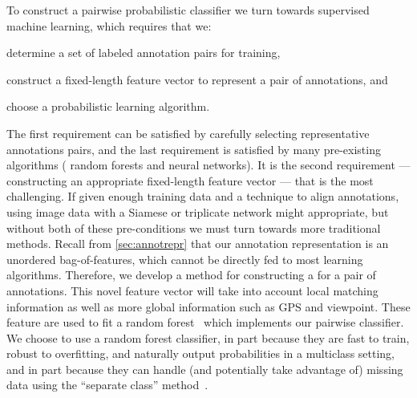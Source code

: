 \MatchStateExample{}

To construct a pairwise probabilistic classifier we turn towards supervised
  machine learning, which requires that we:
\begin{enumin}

    \item determine a set of labeled annotation pairs for training, 

    \item construct a fixed-length feature vector to represent a pair of
        annotations,  and 

    \item choose a probabilistic learning algorithm.
\end{enumin}
The first requirement can be satisfied by carefully selecting representative
  annotations pairs, and the last requirement is satisfied by many pre-existing
  algorithms (\eg{} random forests and neural networks).
It is the second requirement --- constructing an appropriate fixed-length
  feature vector --- that is the most challenging.
If given enough training data and a technique to align annotations, using
  image data with a Siamese or triplicate network might appropriate, but without
  both of these pre-conditions we must turn towards more traditional methods.
Recall from \cref{sec:annotrepr} that our annotation representation is an
  unordered bag-of-features, which cannot be directly fed to most learning
  algorithms.
Therefore, we develop a method for constructing a  for a pair of annotations.
This novel feature vector will take into account local matching information as
  well as more global information such as GPS and viewpoint.
These feature are used to fit a random forest~\cite{breiman_random_2001} which
  implements our pairwise classifier.
We choose to use a random forest classifier, in part because they are fast to
  train, robust to overfitting, and naturally output probabilities in a
  multiclass setting, and in part because they can handle (and potentially take
  advantage of) missing data using the ``separate class''
  method~\cite{ding_investigation_2010}.
  

